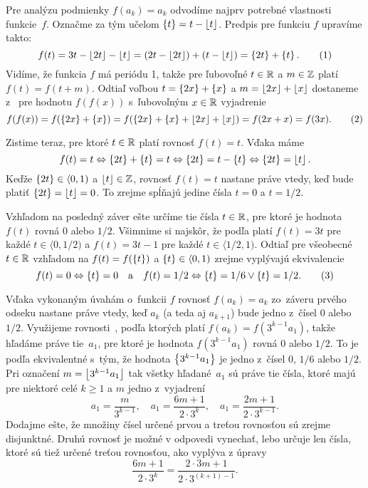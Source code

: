{Pre analýzu podmienky $f(a_k)=a_k$ odvodíme najprv
potrebné vlastnosti funkcie~$f$. Označme za tým učelom
$\left\{t\right\}=t-\left\lfloor t\right\rfloor$.
Predpis pre funkciu $f$ upravíme takto:
$$
f(t)=3t-\ce{2t}-\ce{t}=(2t-\ce{2t})+(t-\ce{t})=\zl{2t}+\zl{t} .
\tag1
$$
Vidíme, že funkcia $f$ má periódu 1, takže pre ľubovoľné
$t\in\Bbb R$ a $m\in\Bbb Z$ platí $f(t)=f(t+m)$. Odtiaľ voľbou
$t=\left\{2x\right\}+\left\{x\right\}$ a $m=\left\lfloor2x\right\rfloor+\left\lfloor x\right\rfloor$ dostaneme z~
pre hodnotu $f(f(x))$ s~ľubovoľným $x\in\Bbb R$ vyjadrenie
$$
f(f(x))=f(\zl{2x}+\zl{x})
=f(\zl{2x}+\zl{x}+\ce{2x}+\ce{x})=f(2x+x)=f(3x).
\tag2
$$

Zistime teraz, pre ktoré $t\in\Bbb R$ platí rovnosť $f(t)=t$.
Vďaka  máme
$$
f(t)=t\Leftrightarrow \left\{2t\right\}+\left\{t\right\}=t \Leftrightarrow \left\{2t\right\}=t-\left\{t\right\}\Leftrightarrow
\left\{2t\right\}=\left\lfloor t\right\rfloor.
$$
Keďže $\left\{2t\right\}\in\langle0,1)$ a $\left\lfloor t\right\rfloor\in\Bbb Z$,
rovnosť $f(t)=t$ nastane práve vtedy, keď bude platiť
$\left\{2t\right\}=\left\lfloor t\right\rfloor=0$. To zrejme spĺňajú jedine čísla $t=0$ a
$t=1/2$.

Vzhľadom na posledný záver ešte určíme tie čísla $t\in\Bbb R$, pre ktoré
je hodnota~$f(t)$ rovná 0 alebo $1/2$.
Všimnime si najskôr, že podľa  platí $f(t)=3t$ pre každé
$t\in\langle0,1/2)$ a $f(t)=3t-1$ pre každé $t\in\langle1/2,1)$.
Odtiaľ pre všeobecné $t\in\Bbb R$ vzhľadom na $f(t)=f(\left\{t\right\})$ a
$\left\{t\right\}\in\langle0,1)$ zrejme vyplývajú ekvivalencie
$$
f(t)=0\Ekv \zl{t}=0\quad\hbox{a}\quad
f(t)=1/2\Ekv \zl{t}=1/6\lor\zl{t}=1/2.
\tag3
$$

Vďaka vykonaným úvahám o~funkcii $f$ rovnosť $f(a_k)=a_k$ zo~záveru
prvého odseku nastane práve vtedy, keď $a_k$ (a teda aj
$a_{k+1}$) bude jedno z~čísel 0 alebo~$1/2$. Využijeme rovnosti~,
podľa ktorých platí $f(a_k)=f(3^{k-1}a_1)$, takže hľadáme práve tie~$a_1$,
pre ktoré je hodnota $f(3^{k-1}a_1)$ rovná 0 alebo $1/2$.
To je podľa  ekvivalentné s~tým, že hodnota $\left\{3^{k-1}a_1\right\}$
je jedno z~čísel 0, $1/6$ alebo $1/2$. Pri označení
$m=\left\lfloor3^{k-1}a_1\right\rfloor$ tak všetky hľadané~$a_1$ sú práve tie
čísla, ktoré majú pre niektoré celé $k\geq1$ a $m$ jedno
z~vyjadrení
$$
a_1=\frac{m}{3^{k-1}},\quad
a_1=\frac{6m+1}{2\cdot3^{k}},\quad
a_1=\frac{2m+1}{2\cdot3^{k-1}}.
$$
Dodajme ešte, že množiny čísel určené prvou a treťou rovnosťou
sú zrejme disjunktné. Druhú rovnosť je možné v odpovedi vynechať,
lebo určuje len čísla, ktoré sú tiež určené treťou rovnosťou,
ako vyplýva z úpravy
$$
\frac{6m+1}{2\cdot3^k}=\frac{2\cdot3m+1}{2\cdot3^{(k+1)-1}}.
$$
}

